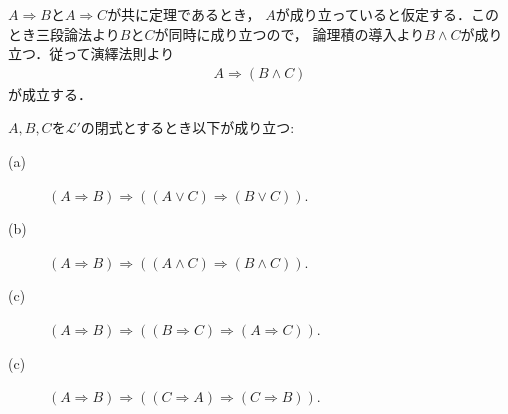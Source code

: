 	\begin{prf}
		$A \Longrightarrow B$と$A \Longrightarrow C$が共に定理であるとき，
		$A$が成り立っていると仮定する．このとき三段論法より$B$と$C$が同時に成り立つので，
		論理積の導入より$B \wedge C$が成り立つ．従って演繹法則より
		\begin{align}
			A \Longrightarrow (B \wedge C)
		\end{align}
		が成立する．
		\QED
	\end{prf}
	
	\begin{screen}
		\begin{logicalthm}[含意は遺伝する]\label{logicalthm:rule_of_inference_1}
			$A,B,C$を$\mathcal{L}'$の閉式とするとき以下が成り立つ:
			\begin{description}
				\item[(a)] $(A \Longrightarrow B) \Longrightarrow ( (A \vee C) \Longrightarrow (B \vee C) )$.
				
				\item[(b)] $(A \Longrightarrow B) \Longrightarrow ( (A \wedge C) \Longrightarrow (B \wedge C) )$.
				
				\item[(c)] $(A \Longrightarrow B) \Longrightarrow ( (B \Longrightarrow C) \Longrightarrow (A \Longrightarrow C) )$.
				
				\item[(c)] $(A \Longrightarrow B) \Longrightarrow ( (C \Longrightarrow A) \Longrightarrow (C \Longrightarrow B) )$.
			\end{description}
		\end{logicalthm}
	\end{screen}
	
